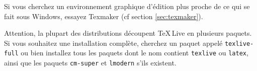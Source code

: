 Si vous cherchez un environnement graphique d'édition plus proche de
ce qui se fait sous Windows, essayez Texmaker (cf section
\ref{sec:texmaker}).

Attention, la plupart des distributions découpent \TeX\,Live en
plusieurs paquets. Si vous souhaitez une installation complète,
cherchez un paquet appelé \texttt{texlive-full} ou bien installez tous
les paquets dont le nom contient \texttt{texlive} ou \texttt{latex},
ainsi que les paquets \texttt{cm-super} et \texttt{lmodern} s'ils
existent.
